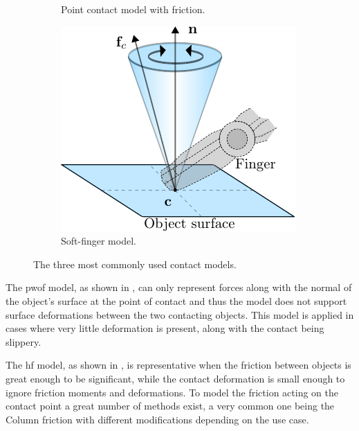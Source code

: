 \begin{figure}[h]
\begin{subfigure}[b]{0.3\textwidth}
		\caption{Point contact model with friction.}
		\label{fig:hf}
	\end{subfigure}
	\hfill
	\begin{subfigure}[b]{0.3\textwidth}
		\centering
		\includegraphics[width=\textwidth]{chapters/modeling/fig/sf.pdf}
		\caption{Soft-finger model.}
		\label{fig:sf}
	\end{subfigure}
	   \caption{The three most commonly used contact models.}
	   \label{fig:contact-models}
\end{figure}

The \gls{pwof} model, as shown in , can only represent forces along with the normal of the object's surface at the point of contact and thus the model does not support surface deformations between the two contacting objects. This model is applied in cases where very little deformation is present, along with the contact being slippery\cite[Chapter 38]{handbook-of-robotics}.\medskip


The \gls{hf} model, as shown in , is representative when the friction between objects is great enough to be significant, while the contact deformation is small enough to ignore friction moments and deformations\cite[Chapter 38]{handbook-of-robotics}. To model the friction acting on the contact point a great number of methods exist, a very common one being the Column friction with different modifications depending on the use case\cite*{modelling-of-joint-friction-in-robotic-manipulators-with-gear-transmissions}. \medskip
%

